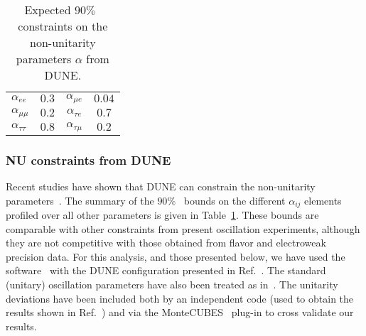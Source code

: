 \begin{table}[htb]
\caption[Expected $90 \%$~ constraints on the non-unitarity parameters $\alpha$]{\label{tab:bounds} Expected $90 \%$~  constraints on the non-unitarity parameters $\alpha$ from DUNE. }
\begin{center}
\renewcommand{\arraystretch}{1.6}
\begin{tabular}{  l@{\quad\quad}  c@{\quad\quad}   c@{\quad\quad}   c@{\quad\quad}      }
\hline
$\alpha_{ee}$ & $0.3$ & $\alpha_{\mu e}$ & $0.04$  \\
$\alpha_{\mu\mu}$ & $0.2$ & $\alpha_{\tau e}$ & $0.7$ \\
$\alpha_{\tau\tau}$ & $0.8$ & $\alpha_{\tau\mu}$ & $0.2$  \\ \hline
\end{tabular}
\end{center}
\end{table}

\subsubsection{NU constraints from DUNE}
Recent studies have shown that DUNE can constrain the non-unitarity parameters~\cite{Blennow:2016jkn, Escrihuela:2016ube}. The summary of the $90 \%$~  bounds on the different $\alpha_{ij}$ elements profiled over all other parameters is given in Table~\ref{tab:bounds}. 
These bounds are comparable with other constraints from present oscillation experiments, although they are not competitive with those obtained from flavor and electroweak precision data.
For this analysis, and %
those presented below, we have used the   software~\cite{Huber:2004ka,Huber:2007ji} with the DUNE  configuration presented in Ref.~\cite{Alion:2016uaj}. The standard (unitary) oscillation parameters have also been treated as in~\cite{Alion:2016uaj}. The unitarity deviations have been included both by an independent code (used to obtain the results shown in Ref.~\cite{Escrihuela:2016ube}) and via the MonteCUBES~\cite{Blennow:2009pk} plug-in to cross validate our results.

